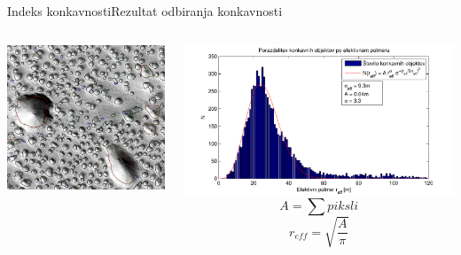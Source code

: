 \documentclass{beamer}
\begin{document}
\begin{frame}{Indeks konkavnosti}{Rezultat odbiranja konkavnosti}
\begin{columns}
  \begin{column}{0.55\textwidth}
    \hspace*{-0.02\textwidth}\includegraphics[width=\textwidth]{slike/menisija-vrtace}
  \end{column}

  \begin{column}{0.5\textwidth}
    \hspace*{-0.15\textwidth}\includegraphics[width=1.3\textwidth]{slike/menisija-polmeri-hist-maxwell}
    \footnotesize
    \begin{equation} A = \sum piksli \end{equation}
    \begin{equation}r_{eff} = \sqrt{\frac{A}{\pi}} \end{equation}
  \end{column}
\end{columns}
\end{frame}
\end{document}
